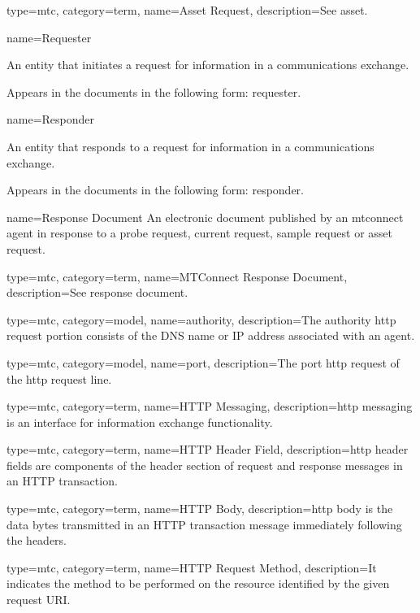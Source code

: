 {
  type=mtc,
  category=term,
  name={Asset Request},
  description={See \gls{asset}.}
}


{
  name={Requester}
}
{
	An entity that initiates a \gls{request} for information in a communications exchange.

	Appears in the documents in the following form: \gls{requester}.
}


{
  name={Responder}
}
{
	An entity that responds to a \gls{request} for information in a communications exchange.

	Appears in the documents in the following form: \gls{responder}.
}


{
  name={Response Document}
}
{
	An electronic document published by an \gls{mtconnect agent} in response to a \gls{probe request}, \gls{current request}, \gls{sample request} or \gls{asset request}.
}

{
  type=mtc,
  category=term,
  name={MTConnect Response Document},
  description={See \gls{response document}.}
}

{
  type=mtc,
  category=model,
  name={authority},
  description={The \gls{authority http request} portion consists of the DNS name or IP address associated with an \gls{agent}.}
}

{
  type=mtc,
  category=model,
  name={port},
  description={The \gls{port http request} of the \gls{http request line}.}
}

{
  type=mtc,
  category=term,
  name={HTTP Messaging},
  description={\gls{http messaging} is an interface for information exchange functionality.}
}

{
  type=mtc,
  category=term,
  name={HTTP Header Field},
  description={\glspl{http header field} are components of the header section of request and response messages in an HTTP transaction.}
}

{
  type=mtc,
  category=term,
  name={HTTP Body},
  description={\gls{http body} is the data bytes transmitted in an HTTP transaction message immediately following the headers.}
}

{
  type=mtc,
  category=term,
  name={HTTP Request Method},
  description={It indicates the method to be performed on the resource identified by the given request URI.}
}


